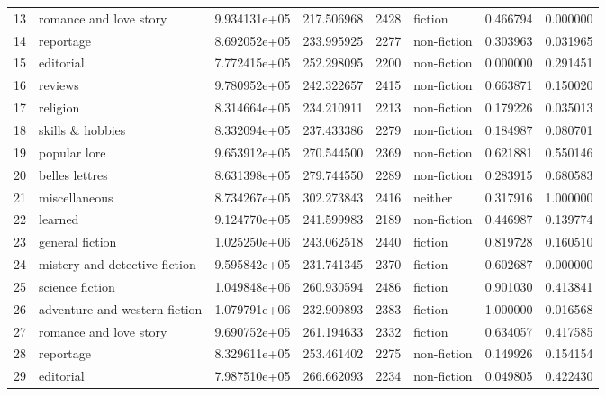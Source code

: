 \documentclass[11pt]{article}
\begin{document}
\begin{longtable}{llrrrlrr}
13 &         romance and love story &  9.934131e+05 &  217.506968 &  2428 &       fiction &    0.466794 &     0.000000 \\
14 &                      reportage &  8.692052e+05 &  233.995925 &  2277 &   non-fiction &    0.303963 &     0.031965 \\
15 &                      editorial &  7.772415e+05 &  252.298095 &  2200 &   non-fiction &    0.000000 &     0.291451 \\
16 &                        reviews &  9.780952e+05 &  242.322657 &  2415 &   non-fiction &    0.663871 &     0.150020 \\
17 &                       religion &  8.314664e+05 &  234.210911 &  2213 &   non-fiction &    0.179226 &     0.035013 \\
18 &               skills \& hobbies &  8.332094e+05 &  237.433386 &  2279 &   non-fiction &    0.184987 &     0.080701 \\
19 &                   popular lore &  9.653912e+05 &  270.544500 &  2369 &   non-fiction &    0.621881 &     0.550146 \\
20 &                 belles lettres &  8.631398e+05 &  279.744550 &  2289 &   non-fiction &    0.283915 &     0.680583 \\
21 &                  miscellaneous &  8.734267e+05 &  302.273843 &  2416 &       neither &    0.317916 &     1.000000 \\
22 &                        learned &  9.124770e+05 &  241.599983 &  2189 &   non-fiction &    0.446987 &     0.139774 \\
23 &                general fiction &  1.025250e+06 &  243.062518 &  2440 &       fiction &    0.819728 &     0.160510 \\
24 &  mistery and detective fiction &  9.595842e+05 &  231.741345 &  2370 &       fiction &    0.602687 &     0.000000 \\
25 &                science fiction &  1.049848e+06 &  260.930594 &  2486 &       fiction &    0.901030 &     0.413841 \\
26 &  adventure and western fiction &  1.079791e+06 &  232.909893 &  2383 &       fiction &    1.000000 &     0.016568 \\
27 &         romance and love story &  9.690752e+05 &  261.194633 &  2332 &       fiction &    0.634057 &     0.417585 \\
28 &                      reportage &  8.329611e+05 &  253.461402 &  2275 &   non-fiction &    0.149926 &     0.154154 \\
29 &                      editorial &  7.987510e+05 &  266.662093 &  2234 &   non-fiction &    0.049805 &     0.422430 \\

\end{longtable}
\end{document}
